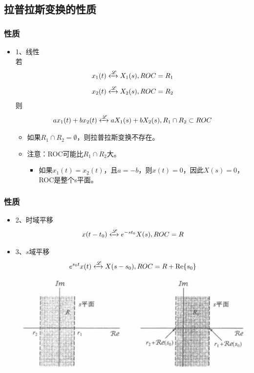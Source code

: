 \documentclass[CJKutf8,dvipsnames,table]{beamer}
\begin{document}
\begin{CJK*}{UTF8}{song}
  \section{拉普拉斯变换的性质}
  
  \begin{frame}
    \frametitle{性质}
    \begin{itemize}
    \item 1、线性 \\
    若
    \[
    x_1(t) \xleftrightarrow{\mathscr{L}} X_1(s), ROC=R_1
    \]
    \[
    x_2(t) \xleftrightarrow{\mathscr{L}} X_2(s), ROC=R_2
    \]
    则
    \[
    ax_1(t)+bx_2(t) \xleftrightarrow{\mathscr{L}} aX_1(s)+bX_2(s), R_1 \cap R_2 \subset ROC 
    \]
    	\begin{itemize}
    	\item 如果$R_1 \cap R_2=\emptyset$，则拉普拉斯变换不存在。
   		\item 注意：ROC可能比$R_1 \cap R_2$大。
			\begin{itemize}
			\item 如果$x_1(t)=x_2(t)$，且$a=-b$，则$x(t)=0$，因此$X(s)=0$，ROC是整个s平面。
			\end{itemize}
    	\end{itemize}
    \end{itemize}
  \end{frame} 
    
  \begin{frame}
    \frametitle{性质}
    \begin{itemize}
    \item 2、时域平移 \\
    \[
    x(t-t_0) \xleftrightarrow{\mathscr{L}} e^{-st_0}X(s), ROC=R
    \]
    \item 3、$s$域平移 
    \[
    e^{s_0 t}x(t) \xleftrightarrow{\mathscr{L}} X(s-s_0), ROC=R+\operatorname{Re}\{s_0\}
    \]
    \begin{center}
      \includegraphics[scale=.5]{ss-c-f9-23}
    \end{center}
    \end{itemize}
  \end{frame}
      

\end{CJK*}
\end{document}
